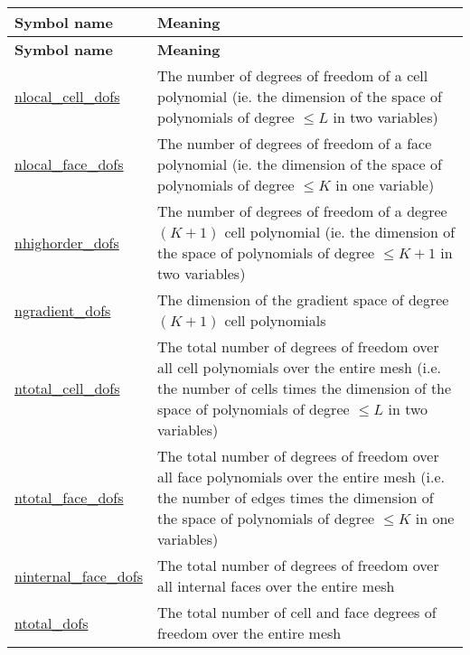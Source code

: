 \tabulinesep=1mm
\begin{longtabu} spread 0pt [c]{*{2}{|X[-1]}|}
\hline
\rowcolor{\tableheadbgcolor}\textbf{ Symbol name }&\textbf{ Meaning  }\\
\endfirsthead
\hline
\endfoot
\hline
\rowcolor{\tableheadbgcolor}\textbf{ Symbol name }&\textbf{ Meaning  }\\
\endhead
\hyperlink{group__HybridCore_gab698480a3a9e9339d5c191549b817501}{nlocal\+\_\+cell\+\_\+dofs} &The number of degrees of freedom of a cell polynomial (ie. the dimension of the space of polynomials of degree $\le L$ in two variables) \\
\hyperlink{group__HybridCore_ga41f1294e34e4daade19ad16981eaac15}{nlocal\+\_\+face\+\_\+dofs} &The number of degrees of freedom of a face polynomial (ie. the dimension of the space of polynomials of degree $\le K$ in one variable) \\
\hyperlink{group__HybridCore_ga57c23358c4ca7e485e8382c6b2761ad5}{nhighorder\+\_\+dofs} &The number of degrees of freedom of a degree $(K+1)$ cell polynomial (ie. the dimension of the space of polynomials of degree $\le K+1$ in two variables) \\
\hyperlink{group__HybridCore_gaffe520cbcf3d8212a503d51f11c13e5f}{ngradient\+\_\+dofs} &The dimension of the gradient space of degree $(K+1)$ cell polynomials \\
\hyperlink{group__HybridCore_ga86e6a3566cf506821606c8802a5f2364}{ntotal\+\_\+cell\+\_\+dofs} &The total number of degrees of freedom over all cell polynomials over the entire mesh (i.\+e. the number of cells times the dimension of the space of polynomials of degree $\le L$ in two variables) \\
\hyperlink{group__HybridCore_gac0af0b8fa9bea07b9cfba8cbb1b50bed}{ntotal\+\_\+face\+\_\+dofs} &The total number of degrees of freedom over all face polynomials over the entire mesh (i.\+e. the number of edges times the dimension of the space of polynomials of degree $\le K$ in one variables) \\
\hyperlink{group__HybridCore_ga95c76303ee1dabc5c78f0bdd7a2c6aaa}{ninternal\+\_\+face\+\_\+dofs} &The total number of degrees of freedom over all internal faces over the entire mesh \\
\hyperlink{group__HybridCore_gaf887b486ad0eea60382e306f1487b44a}{ntotal\+\_\+dofs} &The total number of cell and face degrees of freedom over the entire mesh \\
\end{longtabu}
